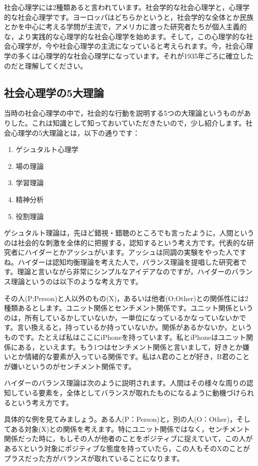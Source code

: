 \documentclass{ltjsbook}
\begin{document}
社会心理学には2種類あると言われています。社会学的な社会心理学と，心理学的な社会心理学です。ヨーロッパはどちらかというと，社会学的な全体とか民族とかを中心に考える学問が主流で，アメリカに渡った研究者たちが個人主義的な，より実践的な心理学的な社会心理学を始めます。そして，この心理学的な社会心理学が，今や社会心理学の主流になっていると考えられます。今，社会心理学の多くは心理学的な社会心理学になっています。それが1935年ごろに確立したのだと理解してください。

\subsection{社会心理学の5大理論}
当時の社会心理学の中で，社会的な行動を説明する5つの大理論というものがありした。これは知識として知っておいていただきたいので，少し紹介します。社会心理学の5大理論とは，以下の通りです：
\begin{enumerate}
    \item ゲシュタルト心理学
    \item 場の理論
    \item 学習理論
    \item 精神分析
    \item 役割理論
\end{enumerate}

ゲシュタルト理論は，先ほど錯視・錯聴のところでも言ったように，人間というのは社会的な刺激を全体的に把握する，認知するという考え方です。代表的な研究者にハイダーとかアッシュがいます。アッシュは同調の実験をやった人ですね。ハイダーは認知均衡理論を考えた人で，バランス理論を提唱した研究者です。理論と言いながら非常にシンプルなアイデアなのですが，ハイダーのバランス理論というのは以下のような考え方です。

その人(P;Person)と人以外のもの(X)，あるいは他者(O;Other)との関係性には2種類あるとします。ユニット関係とセンチメント関係です。ユニット関係というのは，所有しているかしていないか，一単位になっているかなっていないかです。言い換えると，持っているか持っていないか。関係があるかないか，というものです。たとえば私はここにiPhoneを持っています。私とiPhoneはユニット関係にある，といえます。もう1つはセンチメント関係と言いまして，好きとか嫌いとか情緒的な要素が入っている関係です。私はA君のことが好き，B君のことが嫌いというのがセンチメント関係です。

ハイダーのバランス理論は次のように説明されます。人間はその様々な周りの認知している要素を，全体としてバランスが取れたものになるように動機づけられるという考え方です。

具体的な例を見てみましょう。ある人(P：Person)と，別の人(O：Other)，そしてある対象(X)との関係を考えます。特にユニット関係ではなく，センチメント関係だった時に，もしその人が他者のことをポジティブに捉えていて，この人があるXという対象にポジティブな態度を持っていたら，この人もそのXのことがプラスだった方がバランスが取れていることになります。
\end{document}
